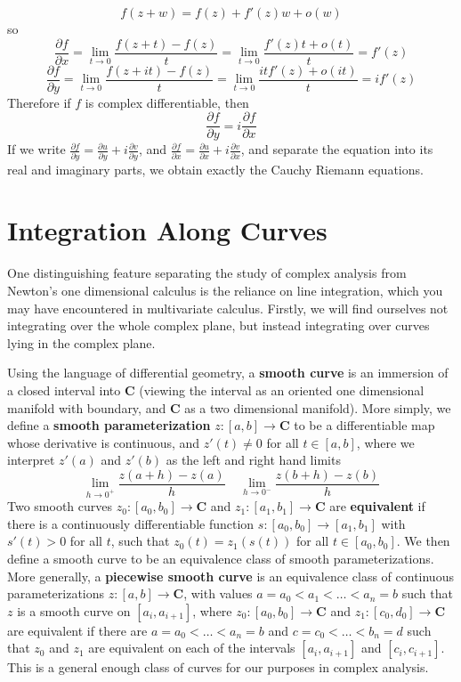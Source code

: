 %
\[ f(z + w) = f(z) + f'(z)w + o(w) \]
%
so
%
\[ \frac{\partial f}{\partial x} = \lim_{t \to 0} \frac{f(z + t) - f(z)}{t} = \lim_{t \to 0} \frac{f'(z)t + o(t)}{t} = f'(z) \]
\[ \frac{\partial f}{\partial y} = \lim_{t \to 0} \frac{f(z + it) - f(z)}{t} = \lim_{t \to 0} \frac{itf'(z) + o(it)}{t} = if'(z) \]
%
Therefore if $f$ is complex differentiable, then
%
\[ \frac{\partial f}{\partial y} = i\frac{\partial f}{\partial x} \]
%
If we write $\frac{\partial f}{\partial y} = \frac{\partial u}{\partial y} + i \frac{\partial v}{\partial y}$, and $\frac{\partial f}{\partial x} = \frac{\partial u}{\partial x} + i \frac{\partial v}{\partial x}$, and separate the equation into its real and imaginary parts, we obtain exactly the Cauchy Riemann equations.

\section{Integration Along Curves}

One distinguishing feature separating the study of complex analysis from Newton's one dimensional calculus is the reliance on line integration, which you may have encountered in multivariate calculus. Firstly, we will find ourselves not integrating over the whole complex plane, but instead integrating over curves lying in the complex plane.

Using the language of differential geometry, a {\bf smooth curve} is an immersion of a closed interval into $\mathbf{C}$ (viewing the interval as an oriented one dimensional manifold with boundary, and $\mathbf{C}$ as a two dimensional manifold). More simply, we define a {\bf smooth parameterization} $z: [a,b] \to \mathbf{C}$ to be a differentiable map whose derivative is continuous, and $z'(t) \neq 0$ for all $t \in [a,b]$, where we interpret $z'(a)$ and $z'(b)$ as the left and right hand limits
%
\[ \lim_{h \to 0^+} \frac{z(a + h) - z(a)}{h}\ \ \ \ \ \lim_{h \to 0^-} \frac{z(b + h) - z(b)}{h} \]
%
Two smooth curves $z_0: [a_0,b_0] \to \mathbf{C}$ and $z_1: [a_1,b_1] \to \mathbf{C}$ are {\bf equivalent} if there is a continuously differentiable function $s: [a_0,b_0] \to [a_1,b_1]$ with $s'(t) > 0$ for all $t$, such that $z_0(t) = z_1(s(t))$ for all $t \in [a_0,b_0]$. We then define a smooth curve to be an equivalence class of smooth parameterizations. More generally, a {\bf piecewise smooth curve} is an equivalence class of continuous parameterizations $z: [a,b] \to \mathbf{C}$, with values $a = a_0 < a_1 < \dots < a_n = b$ such that $z$ is a smooth curve on $[a_i,a_{i+1}]$, where $z_0: [a_0,b_0] \to \mathbf{C}$ and $z_1:[c_0,d_0] \to \mathbf{C}$ are equivalent if there are $a = a_0 < \dots < a_n = b$ and $c = c_0 < \dots < b_n = d$ such that $z_0$ and $z_1$ are equivalent on each of the intervals $[a_i,a_{i+1}]$ and $[c_i,c_{i+1}]$. This is a general enough class of curves for our purposes in complex analysis.

